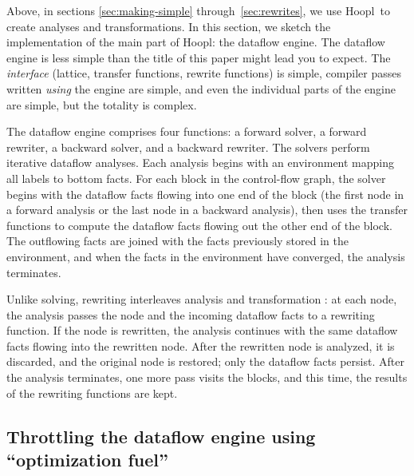 \documentclass[blockstyle,preprint,natbib,nocopyrightspace]{sigplanconf}
\newcommand\ourlib{Hoopl}  %
\let\cite\citep
\def\authornote#1{\unskip\relax}
\newcommand{\simon}[1]{\authornote{SLPJ: #1}}
\newcommand{\norman}[1]{\authornote{NR: #1}}
\let\remark\norman
\begin{document}
\simon{The earlier sections promised that we'd reveal the lies.
Do we?  I see no mention of @HavingSuccessors@ for example, which is rather important
for polymorphism.  Indeed, a subsection on that point might be a good way
to substantiate the claims of the last bullet of the conclusion.}

Above, in sections \ref{sec:making-simple}
through~\ref{sec:rewrites},
we use \ourlib\ to create analyses and transformations.
In this section, we sketch the implementation of the main part of \ourlib:
the dataflow engine.
The dataflow engine 
is less simple than the title of this paper might
lead you to expect.
The \emph{interface} (lattice, transfer functions, rewrite functions) is simple,
compiler passes written \emph{using} the engine
are simple,
and even the individual parts of the engine are simple,
but the totality is complex.

\remark{Simon asked what new insights are gained.
Compared with our earlier work, using CPS dramatically simplifies the
dataflow engine.}

The dataflow engine comprises four functions:
a forward solver, a forward rewriter,
a backward solver, and a backward rewriter.
The solvers perform iterative dataflow analyses.
Each analysis begins with an environment mapping all labels to bottom facts.
For each block in the control-flow graph, the solver begins with the dataflow facts
flowing into one end of the block (the first node in a forward analysis or the last node in a
backward analysis),
then uses the transfer functions to compute the dataflow facts flowing out the other
end of the block.
The outflowing facts are joined with the facts previously stored in the environment,
and when the facts in the environment have converged, the analysis terminates.

Unlike solving, rewriting interleaves analysis and transformation
     \cite{lerner-grove-chambers:2002}:
     at each node, the analysis passes the node and
     the incoming dataflow facts to a rewriting function.
     If the node is rewritten, the analysis continues with the same dataflow facts
     flowing into the rewritten node.
     After the rewritten node is analyzed,
     it is discarded, and the original node is restored;
     only the dataflow facts persist.
After the analysis terminates, one more pass visits the blocks,
      and this time, the results of the rewriting functions are kept.

\subsection{Throttling the dataflow engine using ``optimization fuel''}
\end{document}
